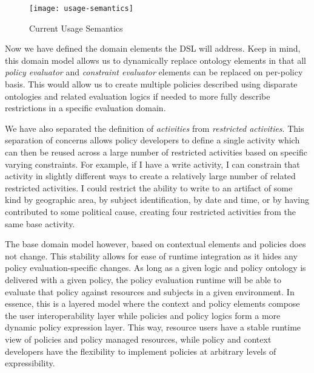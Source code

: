 \begin{figure}[!t]
\centering
\texttt{[image: usage-semantics]}
\caption{Current Usage Semantics}
\label{fig:model:usage-semantics}
\end{figure}

Now we have defined the domain elements the DSL will address.  Keep in mind, this domain model allows us to dynamically replace ontology elements in that all \emph{policy evaluator} and \emph{constraint evaluator} elements can be replaced on per-policy basis.  This would allow us to create multiple policies described using disparate ontologies and related evaluation logics if needed to more fully describe restrictions in a specific evaluation domain.

We have also separated the definition of \emph{activities} from \emph{restricted activities}.  This separation of concerns allows policy developers to define a single activity which can then be reused across a large number of restricted activities based on specific varying constraints.  For example, if I have a write activity, I can constrain that activity in slightly different ways to create a relatively large number of related restricted activities.  I could restrict the ability to write to an artifact of some kind by geographic area, by subject identification, by date and time, or by having contributed to some political cause, creating four restricted activities from the same base activity.

The base domain model however, based on contextual elements and policies does not change.  This stability allows for ease of runtime integration as it hides any policy evaluation-specific changes.  As long as a given logic and policy ontology is delivered with a given policy, the policy evaluation runtime will be able to evaluate that policy against resources and subjects in a given environment.  In essence, this is a layered model where the context and policy elements compose the user interoperability layer while policies and policy logics form a more dynamic policy expression layer.  This way, resource users have a stable runtime view of policies and policy managed resources, while policy and context developers have the flexibility to implement policies at arbitrary levels of expressibility.

